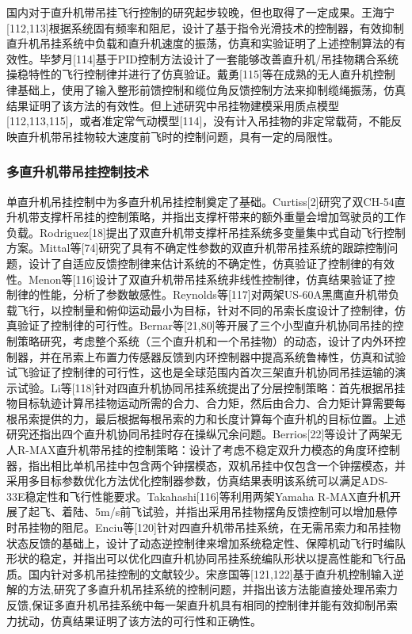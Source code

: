 国内对于直升机带吊挂飞行控制的研究起步较晚，但也取得了一定成果。王海宁[112,113]根据系统固有频率和阻尼，设计了基于指令光滑技术的控制器，有效抑制直升机吊挂系统中负载和直升机速度的振荡，仿真和实验证明了上述控制算法的有效性。毕梦月[114]基于PID控制方法设计了一套能够改善直升机/吊挂物耦合系统操稳特性的飞行控制律并进行了仿真验证。戴勇[115]等在成熟的无人直升机控制律基础上，使用了输入整形前馈控制和缆位角反馈控制方法来抑制缆绳振荡，仿真结果证明了该方法的有效性。但上述研究中吊挂物建模采用质点模型[112,113,115]，或者准定常气动模型[114]，没有计入吊挂物的非定常载荷，不能反映直升机带吊挂物较大速度前飞时的控制问题，具有一定的局限性。

\subsubsection{多直升机带吊挂控制技术}
单直升机吊挂控制中为多直升机吊挂控制奠定了基础。Curtiss[2]研究了双CH-54直升机带支撑杆吊挂的控制策略，并指出支撑杆带来的额外重量会增加驾驶员的工作负载。Rodriguez[18]提出了双直升机带支撑杆吊挂系统多变量集中式自动飞行控制方案。Mittal等[74]研究了具有不确定性参数的双直升机带吊挂系统的跟踪控制问题，设计了自适应反馈控制律来估计系统的不确定性，仿真验证了控制律的有效性。Menon等[116]设计了双直升机带吊挂系统非线性控制律，仿真结果验证了控制律的性能，分析了参数敏感性。Reynolds等[117]对两架US-60A黑鹰直升机带负载飞行，以控制量和俯仰运动最小为目标，针对不同的吊索长度设计了控制律，仿真验证了控制律的可行性。Bernar等[21,80]等开展了三个小型直升机协同吊挂的控制策略研究，考虑整个系统（三个直升机和一个吊挂物）的动态，设计了内外环控制器，并在吊索上布置力传感器反馈到内环控制器中提高系统鲁棒性，仿真和试验试飞验证了控制律的可行性，这也是全球范围内首次三架直升机协同吊挂运输的演示试验。Li等[118]针对四直升机协同吊挂系统提出了分层控制策略：首先根据吊挂物目标轨迹计算吊挂物运动所需的合力、合力矩，然后由合力、合力矩计算需要每根吊索提供的力，最后根据每根吊索的力和长度计算每个直升机的目标位置。上述研究还指出四个直升机协同吊挂时存在操纵冗余问题。Berrios[22]等设计了两架无人R-MAX直升机带吊挂的控制策略：设计了考虑不稳定双升力模态的角度环控制器，指出相比单机吊挂中包含两个钟摆模态，双机吊挂中仅包含一个钟摆模态，并采用多目标参数优化方法优化控制器参数，仿真结果表明该系统可以满足ADS-33E稳定性和飞行性能要求。Takahashi[116]等利用两架Yamaha R-MAX直升机开展了起飞、着陆、5m/s前飞试验，并指出采用吊挂物摆角反馈控制可以增加悬停时吊挂物的阻尼。Enciu等[120]针对四直升机带吊挂系统，在无需吊索力和吊挂物状态反馈的基础上，设计了动态逆控制律来增加系统稳定性、保障机动飞行时编队形状的稳定，并指出可以优化四直升机协同吊挂系统编队形状以提高性能和飞行品质。国内针对多机吊挂控制的文献较少。宋彦国等[121,122]基于直升机控制输入逆解的方法,研究了多直升机吊挂系统的控制问题，并指出该方法能直接处理吊索力反馈,保证多直升机吊挂系统中每一架直升机具有相同的控制律并能有效抑制吊索力扰动，仿真结果证明了该方法的可行性和正确性。

